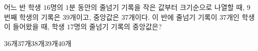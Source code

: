 어느 반 학생 $16$명의 $1$분 동안의 줄넘기 기록을 작은 값부터 크기순으로 나열할 때, $9$번째 학생의 기록은 $39$개이고, 중앙값은 $37$개이다. 이 반에 줄넘기 기록이 $37$개인 학생이 들어왔을 때, 학생 $17$명의 줄넘기 기록의 중앙값은?
\begin{choices32}{$36$개}{$37$개}{$38$개}{$39$개}{$40$개}\end{choices32}
